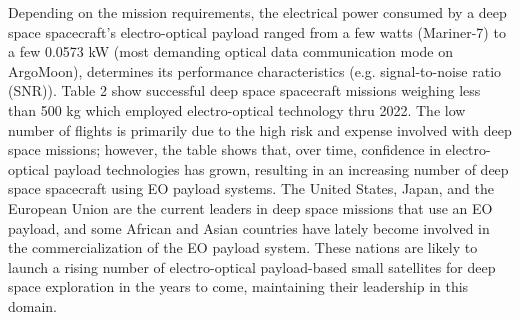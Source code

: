 \documentclass[final,5p,times,sort&compress,twocolumn]{elsarticle}
\begin{document}
Depending on the mission requirements, the electrical power consumed by a deep space spacecraft's electro-optical payload ranged from a few watts (Mariner-7) to a few 0.0573 kW \cite{di2019argomoon} (most demanding optical data communication mode on ArgoMoon), determines its performance characteristics (e.g. signal-to-noise ratio (SNR)). Table 2 show successful deep space spacecraft missions weighing less than 500 kg which employed electro-optical technology thru 2022. The low number of flights is primarily due to the high risk and expense involved with deep space missions; however, the table shows that, over time, confidence in electro-optical payload technologies has grown, resulting in an increasing number of deep space spacecraft using EO payload systems.
The United States, Japan, and the European Union are the current leaders in deep space missions that use an EO payload, and some African and Asian countries have lately become involved in the commercialization of the EO payload system. These nations are likely to launch a rising number of electro-optical payload-based small satellites for deep space exploration in the years to come, maintaining their leadership in this domain.\\
\end{document}
